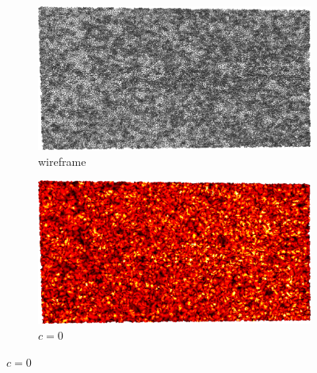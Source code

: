 \begin{figure}[ht]
	\begin{subfigure}[b]{0.49\linewidth}
		\includegraphics[width=\linewidth]
		{data/acquired_meshes/ILATO_1A_SM2066-HE5-60_070214_merged_GMO_r1_n4_v256_wireframe.png}
		\caption{wireframe}\label{ILATO:bun.a}
	\end{subfigure}
	\begin{subfigure}[b]{0.49\linewidth}
		\includegraphics[width=\linewidth]
		{data/acquired_meshes/ILATO_1A_SM2066-HE5-60_070214_merged_GMO_r1_n4_v256_funcvals_0iter.png}
		\caption{$c=0$}\label{fig:buILATOn.b}
	\end{subfigure}
	

\end{figure}
